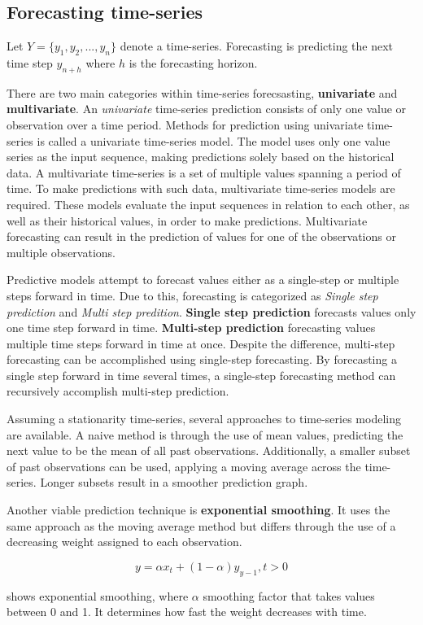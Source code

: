 
\subsection{Forecasting time-series}
\label{section:BT:forecasting-time-series}
Let  $Y = \{y_1, y_2, ..., y_n\}$ denote a time-series.
Forecasting is predicting the next time step $y_{n+h}$ where $h$ is the forecasting horizon.

There are two main categories within time-series forecsasting, \textbf{univariate} and \textbf{multivariate}.
An \textit{univariate} time-series prediction consists of only one value or observation over a time period.
Methods for prediction using univariate time-series is called a univariate time-series model.
The model uses only one value series as the input sequence, making predictions solely based on the historical data.
A multivariate time-series is a set of multiple values spanning a period of time.
To make predictions with such data, multivariate time-series models are required.
These models evaluate the input sequences in relation to each other, as well as their historical values, in order to make predictions.
Multivariate forecasting can result in the prediction of values for one of the observations or multiple observations.


Predictive models attempt to forecast values either as a single-step or multiple steps forward in time.
Due to this, forecasting is categorized as \textit{Single step prediction} and \textit{Multi step predition}.
\textbf{Single step prediction} forecasts values only one time step forward in time.
\textbf{Multi-step prediction} forecasting values multiple time steps forward in time at once.
Despite the difference, multi-step forecasting can be accomplished using single-step forecasting.
By forecasting a single step forward in time several times, a single-step forecasting method can recursively accomplish multi-step prediction.


Assuming a stationarity time-series, several approaches to time-series modeling are available.
A naive method is through the use of mean values, predicting the next value to be the mean of all past observations.
Additionally, a smaller subset of past observations can be used, applying a moving average across the time-series.
Longer subsets result in a smoother prediction graph.

Another viable prediction technique is \textbf{exponential smoothing}.
It uses the same approach as the moving average method but differs through the use of
a decreasing weight assigned to each observation.

\begin{equation}
  \label{eq:exponential_smoothing}
  y = \alpha x_t + (1 - \alpha)y_{y-1}, t > 0
\end{equation}

shows exponential smoothing, where $\alpha$ smoothing factor
that takes values between 0 and 1. It determines how fast the weight decreases with time.



